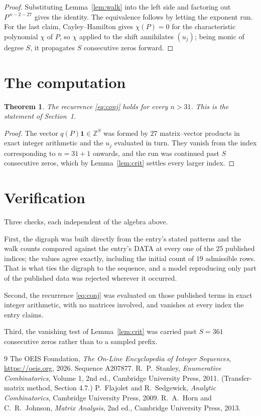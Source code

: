 \documentclass[11pt,a4paper]{article}
\theoremstyle{plain}
\newtheorem{theorem}{Theorem}
\theoremstyle{definition}
\begin{document}
\begin{proof}
Substituting Lemma~\ref{lem:walk} into the left side and factoring out
$P^{\,n-2-27}$ gives the identity. The equivalence follows by letting the exponent
run. For the last claim, Cayley--Hamilton gives $\chi(P)=0$ for the characteristic
polynomial $\chi$ of $P$, so $\chi$ applied to the shift annihilates $(u_j)$; being monic of
degree $S$, it propagates $S$ consecutive zeros forward.
\end{proof}

\section{The computation}

\begin{theorem}
The recurrence \eqref{eq:conj} holds for every $n>31$. This is the statement of
Section~1.
\end{theorem}

\begin{proof}
The vector $q(P)\mathbf{1}\in\mathbb{Z}^{S}$ was formed by $27$ matrix--vector
products in exact integer arithmetic and the $u_j$ evaluated in turn. They vanish from the
index corresponding to $n=31+1$ onwards, and the run was continued past $S$ consecutive
zeros, which by Lemma~\ref{lem:crit} settles every larger index.
\end{proof}

\section{Verification}

Three checks, each independent of the algebra above.

First, the digraph was built directly from the entry's stated patterns and the walk counts
compared against the entry's DATA at every one of the $25$ published indices; the
values agree exactly, including the initial count of $19$ admissible rows. That is
what ties the digraph to the sequence, and a model reproducing only part of the published
data was rejected wherever it occurred.

Second, the recurrence \eqref{eq:conj} was evaluated on those published terms in exact
integer arithmetic, with no matrices involved, and vanishes at every index the entry claims.

Third, the vanishing test of Lemma~\ref{lem:crit} was carried past $S=361$ consecutive
zeros rather than to a sampled prefix.

\begin{thebibliography}{9}
 The OEIS Foundation, \emph{The On-Line Encyclopedia of Integer
Sequences}, \url{https://oeis.org}, 2026. Sequence A207877.
 R.~P.~Stanley, \emph{Enumerative Combinatorics}, Volume 1, 2nd ed.,
Cambridge University Press, 2011. (Transfer-matrix method, Section 4.7.)
 P.~Flajolet and R.~Sedgewick, \emph{Analytic Combinatorics}, Cambridge
University Press, 2009.
 R.~A.~Horn and C.~R.~Johnson, \emph{Matrix Analysis}, 2nd ed., Cambridge
University Press, 2013.
\end{thebibliography}
\end{document}
